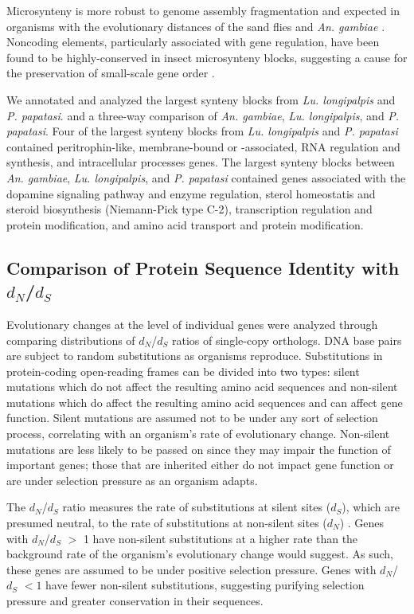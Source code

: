 Microsynteny is more robust to genome assembly fragmentation and expected in organisms with the evolutionary distances of the sand flies and \emph{An. gambiae} \cite{Zdobnov2002}. Noncoding elements, particularly associated with gene regulation, have been found to be highly-conserved in insect microsynteny blocks, suggesting a cause for the preservation of small-scale gene order \cite{Engstrom2007}.

We annotated and analyzed the largest synteny blocks from \emph{Lu. longipalpis} and \emph{P. papatasi}. and a three-way comparison of \emph{An. gambiae}, \emph{Lu. longipalpis}, and \emph{P. papatasi}.  Four of the largest synteny blocks from \emph{Lu. longipalpis} and \emph{P. papatasi} contained peritrophin-like, membrane-bound or -associated, RNA regulation and synthesis, and intracellular processes genes. The largest synteny blocks between \emph{An. gambiae}, \emph{Lu. longipalpis}, and \emph{P. papatasi} contained genes associated with the dopamine signaling pathway and enzyme regulation, sterol homeostatis and steroid biosynthesis (Niemann-Pick type C-2), transcription regulation and protein modification, and amino acid transport and protein modification.

\subsection{Comparison of Protein Sequence Identity with $d_N$/$d_S$}
Evolutionary changes at the level of individual genes were analyzed through comparing distributions of $d_N$/$d_S$ ratios of single-copy orthologs. DNA base pairs are subject to random substitutions as organisms reproduce.  Substitutions in protein-coding open-reading frames can be divided into two types: silent mutations which do not affect the resulting amino acid sequences and non-silent mutations which do affect the resulting amino acid sequences and can affect gene function.  Silent mutations are assumed not to be under any sort of selection process, correlating with an organism's rate of evolutionary change.  Non-silent mutations are less likely to be passed on since they may impair the function of important genes; those that are inherited either do not impact gene function or are under selection pressure as an organism adapts.

The $d_N$/$d_S$ ratio measures the rate of substitutions at silent sites ($d_S$), which are presumed neutral, to the rate of substitutions at non-silent sites ($d_N$) \cite{Kryazhimskiy2008}. Genes with $d_N$/$d_S$ $>$ 1 have non-silent substitutions at a higher rate than the background rate of the organism's evolutionary change would suggest.  As such, these genes are assumed to be under positive selection pressure.  Genes with $d_N$/$d_S$ $<1$ have fewer non-silent substitutions, suggesting purifying selection pressure and greater conservation in their sequences.

